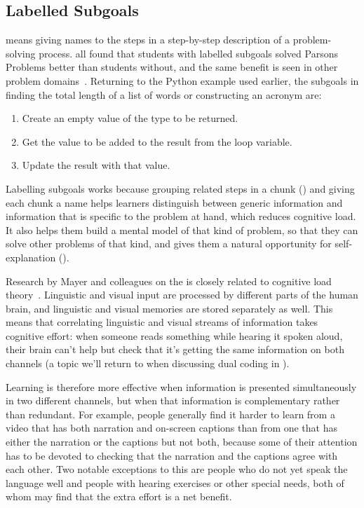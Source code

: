 \subsection*{Labelled Subgoals}

 means giving names
to the steps in a step-by-step description of a problem-solving process.
\cite{Marg2016,Morr2016} all found that students with labelled
subgoals solved Parsons Problems better than students without, and the
same benefit is seen in other problem domains~\cite{Marg2012}.
Returning to the Python example used earlier, the subgoals in finding
the total length of a list of words or constructing an acronym are:

\begin{enumerate}
\item
  Create an empty value of the type to be returned.
\item
  Get the value to be added to the result from the loop variable.
\item
  Update the result with that value.
\end{enumerate}

Labelling subgoals works because grouping related steps in a chunk
() and giving each chunk a name helps
learners distinguish between generic information and information that is
specific to the problem at hand, which reduces cognitive load. It also
helps them build a mental model of that kind of problem, so that they
can solve other problems of that kind, and gives them a natural
opportunity for self-explanation ().


Research by Mayer and colleagues on the
 is
closely related to cognitive load theory~\cite{Maye2003}. Linguistic
and visual input are processed by different parts of the human brain,
and linguistic and visual memories are stored separately as well. This
means that correlating linguistic and visual streams of information
takes cognitive effort: when someone reads something while hearing it
spoken aloud, their brain can't help but check that it's getting the
same information on both channels (a topic we'll return to when
discussing dual coding in ).

Learning is therefore more effective when information is presented
simultaneously in two different channels, but when that information is
complementary rather than redundant. For example, people generally find
it harder to learn from a video that has both narration and on-screen
captions than from one that has either the narration or the captions but
not both, because some of their attention has to be devoted to checking
that the narration and the captions agree with each other. Two notable
exceptions to this are people who do not yet speak the language well and
people with hearing exercises or other special needs, both of whom may
find that the extra effort is a net benefit.

